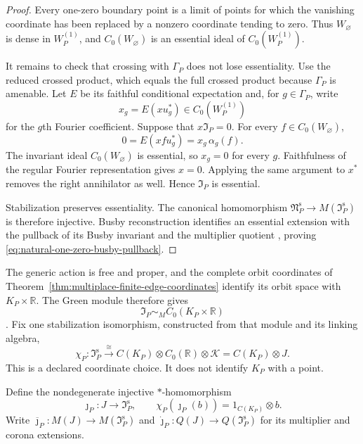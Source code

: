 \begin{proof}
Every one-zero boundary point is a limit of points for which the vanishing
coordinate has been replaced by a nonzero coordinate tending to zero.  Thus
$W_{\varnothing}$ is dense in $W_P^{(1)}$, and
$C_0(W_{\varnothing})$ is an essential ideal of
$C_0(W_P^{(1)})$.

It remains to check that crossing with $\Gamma_P$ does not lose essentiality.
Use the reduced crossed product, which equals the full crossed product because
$\Gamma_P$ is amenable.  Let $E$ be its faithful conditional expectation and,
for $g\in\Gamma_P$, write
\[
 x_g=E(xu_g^*)\in C_0(W_P^{(1)})
\]
for the $g$th Fourier coefficient.  Suppose that
$x\mathfrak I_P=0$.  For every
$f\in C_0(W_{\varnothing})$,
\[
 0=E(xfu_g^*)=x_g\,\alpha_g(f).
\]
The invariant ideal $C_0(W_{\varnothing})$ is essential, so $x_g=0$ for
every $g$.  Faithfulness of the regular Fourier representation gives $x=0$.
Applying the same argument to $x^*$ removes the right annihilator as well.
Hence $\mathfrak I_P$ is essential.

Stabilization preserves essentiality.  The canonical homomorphism
$\mathfrak N_P^{\mathrm s}\to M(\mathfrak I_P^{\mathrm s})$ is therefore
injective.  Busby reconstruction identifies an essential extension with the
pullback of its Busby invariant and the multiplier quotient
\cite[Sections~15.2--15.3, pp.~144--145]{blackadar1986}, proving
\eqref{eq:natural-one-zero-busby-pullback}.
\end{proof}

The generic action is free and proper, and the complete orbit coordinates of
Theorem~\ref{thm:multiplace-finite-edge-coordinates} identify its orbit space
with $K_P\times\mathbb R$.  The Green module therefore gives
\[
 \mathfrak I_P\sim_M C_0(K_P\times\mathbb R)
\]
\cite[Theorem~1.3.22]{meslandSengun2025}.  Fix one stabilization isomorphism,
constructed from that module and its linking algebra,
\begin{equation}
 \chi_P:\mathfrak I_P^{\mathrm s}
 \xrightarrow{\ \cong\ }
 C(K_P)\otimes C_0(\mathbb R)\otimes\mathcal K
 =C(K_P)\otimes J.
 \label{eq:natural-generic-stable-coordinate}
\end{equation}
This is a declared coordinate choice.  It does not identify $K_P$ with a
point.

\begin{definition}
\label{def:constant-unit-fibre-ideal-embedding}
Define the nondegenerate injective $*$-homomorphism
\begin{equation}
 \jmath_P:J\longrightarrow\mathfrak I_P^{\mathrm s},
 \qquad
 \chi_P(\jmath_P(b))=1_{C(K_P)}\otimes b.
 \label{eq:constant-unit-fibre-ideal-embedding}
\end{equation}
Write
$\overline\jmath_P:M(J)\to M(\mathfrak I_P^{\mathrm s})$ and
$\dot\jmath_P:Q(J)\to Q(\mathfrak I_P^{\mathrm s})$ for its multiplier
and corona extensions.
\end{definition}


